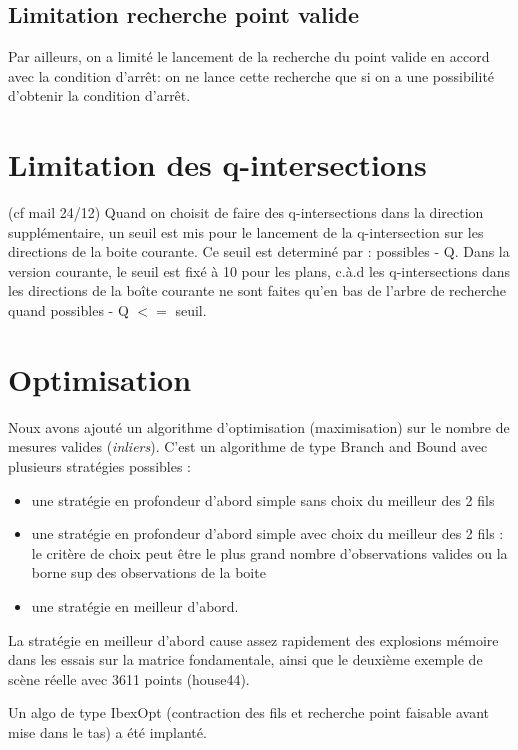 \documentclass{article}
\begin{document}
\subsection{Limitation recherche point valide}
\label{limite-validation}
Par ailleurs, on a limit\'e le lancement de la recherche du point valide en accord avec la condition d'arr\^et:
 on ne lance cette recherche que si on a une possibilit\'e d'obtenir la condition d'arr\^et.
   

\section {Limitation des q-intersections}
\label{limite-qinter}
  (cf mail 24/12)
   Quand on choisit de faire des q-intersections dans la direction suppl\'ementaire, un
seuil est mis pour le lancement de la q-intersection sur les directions de la boite courante.
Ce seuil est determin\'e par :   possibles - Q.
Dans la version courante, le seuil est fix\'e \`a 10 pour les plans, c.\`a.d les q-intersections dans 
les directions de la bo\^ite courante ne sont faites qu'en bas de l'arbre de recherche quand   possibles - Q $<=$ seuil.



\section{Optimisation}
Noux avons ajout\'e un algorithme d'optimisation (maximisation) sur le nombre de mesures valides ({\it inliers}). C'est un algorithme
de type Branch and Bound avec plusieurs strat\'egies possibles : 
\begin{itemize}
\item une strat\'egie  en profondeur d'abord simple sans  choix du meilleur des 2 fils

\item une strat\'egie  en profondeur d'abord simple avec  choix du meilleur des 2 fils : 
 le crit\`ere de choix peut \^etre  le plus grand nombre d'observations valides ou la borne sup des observations de la boite 

\item une strat\'egie en meilleur d'abord.
\end{itemize}
La strat\'egie en meilleur d'abord cause assez rapidement des explosions m\'emoire dans les essais sur la matrice fondamentale, ainsi que le deuxi\`eme exemple de sc\`ene r\'eelle avec 3611 points (house44).


Un algo de type IbexOpt (contraction des fils et recherche point faisable  avant mise dans le tas) a \'et\'e implant\'e.
\end{document}

